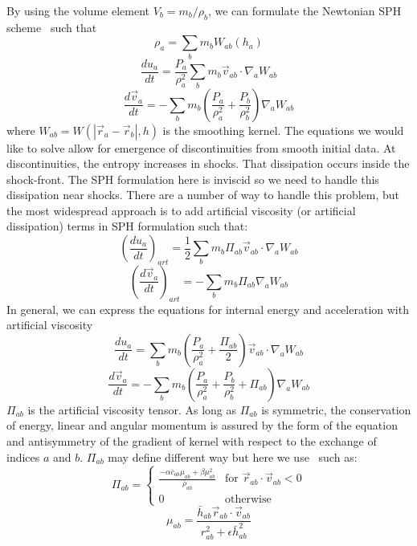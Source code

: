 By using the volume element $V_b = m_b / \rho_b$, we can formulate the Newtonian SPH scheme~\cite{rosswog2009} such that
\begin{equation}
\label{eq:rho}
\rho_a = \sum_b m_b W_{ab} (h_a)
\end{equation}
\begin{equation}
\frac{d u_a}{dt} = \frac{P_a}{\rho_a^2} \sum_b m_b \vec{v}_{ab} \cdot \nabla_a W_{ab} 
\end{equation}
\begin{equation}
\frac{d \vec{v}_a}{d t} = - \sum_b m_b \left(\frac{P_a}{\rho_a^2} + \frac{P_b}{\rho_b^2} \right) \nabla_a W_{ab}
\end{equation}
where $W_{ab} = W(| \vec{r}_a - \vec{r}_b |,h)$ is the smoothing kernel. 
The equations we would like to solve allow for emergence of discontinuities from smooth initial data. 
At discontinuities, the entropy increases in shocks. That dissipation occurs inside the shock-front. 
The SPH formulation here is inviscid so we need to handle this dissipation near shocks. 
There are a number of way to handle this problem, but the most widespread approach is to add artificial viscosity (or artificial dissipation) terms in SPH formulation such that:
\begin{equation}
\left(\frac{d u_a}{dt} \right)_{art} = \frac{1}{2} \sum_b m_b \Pi_{ab} \vec{v}_{ab} \cdot \nabla_a W_{ab}
\end{equation}
\begin{equation}
\left(\frac{d\vec{v}_a}{dt} \right)_{art} = - \sum_b m_b \Pi_{ab}\nabla_a W_{ab}
\end{equation}
In general, we can express the equations for internal energy and acceleration with artificial viscosity
\begin{equation}
\label{eq:intern}
\frac{d u_a}{dt} = \sum_b m_b \left(\frac{P_a}{\rho_a^2} + \frac{\Pi_{ab}}{2} \right) \vec{v}_{ab} \cdot \nabla_a W_{ab}
\end{equation}
\begin{equation}
\label{eq:velo}
\frac{d \vec{v}_a}{d t} = - \sum_b m_b \left(\frac{P_a}{\rho_a^2} + \frac{P_b}{\rho_b^2} + \Pi_{ab} \right) \nabla_a W_{ab}
\end{equation}
$\Pi_{ab}$ is the artificial viscosity tensor. 
As long as $\Pi_{ab}$ is symmetric, the conservation of energy, linear and angular momentum is assured by the form of the equation and antisymmetry of the gradient of kernel with respect to the exchange of indices $a$ and $b$. $\Pi_{ab}$ may define different way but here we use~\cite{Monaghan1983} such as: 
\begin{equation}
\Pi_{ab} = \begin{cases}
\frac{- \alpha \bar{c}_{ab} \mu_{ab} + \beta \mu_{ab}^2}{\bar{\rho}_{ab}} & \text{for $\vec{r}_{ab} \cdot \vec{v}_{ab} < 0$} \\
0 & \text{otherwise}
\end{cases}
\end{equation}
\begin{equation}
\mu_{ab} = \frac{\bar{h}_{ab} \vec{r}_{ab} \cdot \vec{v}_{ab}}{r^2_{ab} + \epsilon \bar{h}_{ab}^2}
\end{equation}

